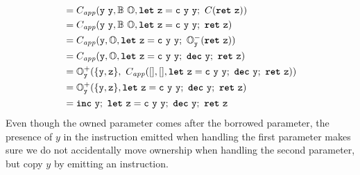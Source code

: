 \documentclass[sigconf]{acmart}
\begin{document}
\begin{enumerate}
\begin{align*}
             &= C_{\textit{app}}(\var{y}\ \var{y}, \bor{}\ \own{}, \kw{let}\ \var{z} = \var{c}\ \var{y}\ \var{y};\ C(\kw{ret}\ \var{z})) \\
             &= C_{\textit{app}}(\var{y}\ \var{y}, \bor{}\ \own{}, \kw{let}\ \var{z} = \var{c}\ \var{y}\ \var{y};\ \kw{ret}\ \var{z}) \\
             &= C_{\textit{app}}(\var{y}, \own{}, \kw{let}\ \var{z} = \var{c}\ \var{y}\ \var{y};\ \own{}^-_\var{y}(\kw{ret}\ \var{z})) \\
             &= C_{\textit{app}}(\var{y}, \own{}, \kw{let}\ \var{z} = \var{c}\ \var{y}\ \var{y};\ \kw{dec}\ \var{y};\ \kw{ret}\ \var{z}) \\
             &= \own{}^+_\var{y}(\{\var{y}, \var{z}\}, \ C_{\textit{app}}([], [], \kw{let}\ \var{z} = \var{c}\ \var{y}\ \var{y};\ \kw{dec}\ \var{y};\ \kw{ret}\ \var{z})) \\
             &= \own{}^+_\var{y}(\{\var{y}, \var{z}\}, \kw{let}\ \var{z} = \var{c}\ \var{y}\ \var{y};\ \kw{dec}\ \var{y};\ \kw{ret}\ \var{z}) \\
             &= \kw{inc}\ \var{y};\ \kw{let}\ \var{z} = \var{c}\ \var{y}\ \var{y};\ \kw{dec}\ \var{y};\ \kw{ret}\ \var{z}
  \end{align*}
  Even though the owned parameter comes after the borrowed parameter, the presence of $y$ in the  instruction emitted when handling the first parameter makes sure we do not accidentally move ownership when handling the second parameter, but copy $y$ by emitting an  instruction.
\end{enumerate}
\end{document}

